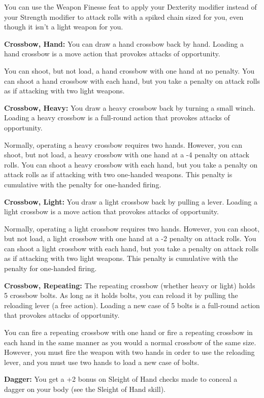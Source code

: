 \documentclass{article}
\begin{document}
You can use the Weapon Finesse feat to apply your Dexterity modifier instead of 
your Strength modifier to attack rolls with a spiked chain sized for you, even 
though it isn't a light weapon for you.

\textbf{Crossbow, Hand:} You can draw a hand crossbow back by hand. Loading a hand 
crossbow is a move action that provokes attacks of opportunity.

You can shoot, but not load, a hand crossbow with one hand at no penalty. You can 
shoot a hand crossbow with each hand, but you take a penalty on attack rolls as 
if attacking with two light weapons.

\textbf{Crossbow, Heavy:} You draw a heavy crossbow back by turning a small winch. 
Loading a heavy crossbow is a full-round action that provokes attacks of opportunity.

Normally, operating a heavy crossbow requires two hands. However, you can shoot, 
but not load, a heavy crossbow with one hand at a -4 penalty on attack rolls. You 
can shoot a heavy crossbow with each hand, but you take a penalty on attack rolls 
as if attacking with two one-handed weapons. This penalty is cumulative with the 
penalty for one-handed firing.

\textbf{Crossbow, Light:} You draw a light crossbow back by pulling a lever. Loading 
a light crossbow is a move action that provokes attacks of opportunity.

Normally, operating a light crossbow requires two hands. However, you can shoot, 
but not load, a light crossbow with one hand at a -2 penalty on attack rolls. You 
can shoot a light crossbow with each hand, but you take a penalty on attack rolls 
as if attacking with two light weapons. This penalty is cumulative with the penalty 
for one-handed firing.

\textbf{Crossbow, Repeating:} The repeating crossbow (whether heavy or light) holds 
5 crossbow bolts. As long as it holds bolts, you can reload it by pulling the reloading 
lever (a free action). Loading a new case of 5 bolts is a full-round action that 
provokes attacks of opportunity.

You can fire a repeating crossbow with one hand or fire a repeating crossbow in 
each hand in the same manner as you would a normal crossbow of the same size. However, 
you must fire the weapon with two hands in order to use the reloading lever, and 
you must use two hands to load a new case of bolts.

\textbf{Dagger:} You get a +2 bonus on Sleight of Hand checks made to conceal a 
dagger on your body (see the Sleight of Hand skill).
\end{document}
